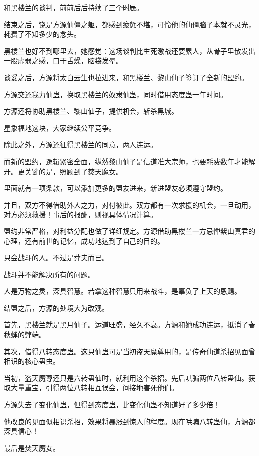 
\begin{this_body}

和黑楼兰的谈判，前前后后持续了三个时辰。

结束之后，饶是方源仙僵之躯，都感到疲惫不堪，可怜他的仙僵脑子本就不灵光，耗费了不知多少的念头。

黑楼兰也好不到哪里去，她感觉：这场谈判比生死激战还要累人，从骨子里散发出一股虚弱之感，口干舌燥，脑袋发晕。

谈妥之后，方源将太白云生也拉进来，和黑楼兰、黎山仙子签订了全新的盟约。

方源交还我力仙蛊，换取黑楼兰的奴隶仙蛊，同时借用态度蛊一年时间。

方源还将协助黑楼兰、黎山仙子，提供机会，斩杀黑城。

星象福地这块，大家继续公平竞争。

除此之外，方源还征得黑楼兰的同意，两人连运。

而新的盟约，逻辑紧密全面，纵然黎山仙子是信道准大宗师，也要耗费数年才能解开。更关键的是，照顾到了焚天魔女。

里面就有一项条款，可以添加更多的盟友进来，新进盟友必须遵守盟约。

并且，双方不得借助外人之力，对付彼此。双方都有一次求援的机会，一旦动用，对方必须救援！事后的报酬，则视具体情况计算。

盟约非常严格，对利益分配也做了详细规定。方源借助黑楼兰一方忌惮紫山真君的心理，还有前世的记忆，成功地达到了自己的目的。

只会战斗的人。不过是莽夫而已。

战斗并不能解决所有的问题。

人是万物之灵，深具智慧。若拿这种智慧只用来战斗，是辜负了上天的恩赐。

结盟之后，方源的处境大为改观。

首先，黑楼兰就是黑月仙子。运道旺盛，经久不衰。方源和她成功连运，抵消了春秋蝉的弊端。

其次，借得八转态度蛊。这只仙蛊可是当初盗天魔尊用的，是传奇仙道杀招见面曾相识的核心蛊虫。

当初，盗天魔尊还只是六转蛊仙时，就利用这个杀招。先后哄骗两位八转蛊仙。获取大量重宝，引得两位八转相互误会，间接地害死他们。

方源失去了变化仙蛊，但得到态度蛊，比变化仙蛊不知道好了多少倍！

他改良的见面似相识杀招，效果将暴涨到惊人的程度。现在哄骗八转蛊仙，方源都深具信心！

最后是焚天魔女。


\end{this_body}
